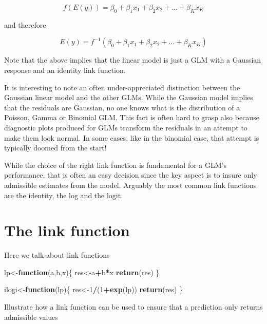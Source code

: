\documentclass[
]{book}
\newenvironment{Shaded}{\begin{snugshade}}{\end{snugshade}}
\newcommand{\ControlFlowTok}[1]{\textcolor[rgb]{0.13,0.29,0.53}{\textbf{#1}}}
\newcommand{\DecValTok}[1]{\textcolor[rgb]{0.00,0.00,0.81}{#1}}
\newcommand{\KeywordTok}[1]{\textcolor[rgb]{0.13,0.29,0.53}{\textbf{#1}}}
\newcommand{\NormalTok}[1]{#1}
\newcommand{\OperatorTok}[1]{\textcolor[rgb]{0.81,0.36,0.00}{\textbf{#1}}}
\begin{document}
\[f(E(y))=\beta_0+\beta_1x_1+\beta_2x_2+...+\beta_Kx_K\]

and therefore

\[E(y)=f^{-1}(\beta_0+\beta_1x_1+\beta_2x_2+...+\beta_Kx_K)\]

Note that the above implies that the linear model is just a GLM with a Gaussian response and an identity link function.

It is interesting to note an often under-appreciated distinction between the Gaussian linear model and the other GLMs. While the Gaussian model implies that the residuals are Gaussian, no one knows what is the distribution of a Poisson, Gamma or Binomial GLM. This fact is often hard to grasp also because diagnostic plots produced for GLMs transform the residuals in an attempt to make them look normal. In some cases, like in the binomial case, that attempt is typically doomed from the start!

While the choice of the right link function is fundamental for a GLM's performance, that is often an easy decision since the key aspect is to insure only admissible estimates from the model. Arguably the most common link functions are the identity, the log and the logit.

\hypertarget{the-link-function}{%
\section{The link function}\label{the-link-function}}

Here we talk about link functions

\begin{Shaded}
\begin{Highlighting}[]
\NormalTok{lp<-}\ControlFlowTok{function}\NormalTok{(a,b,x)\{}
\NormalTok{  res<-a}\OperatorTok{+}\NormalTok{b}\OperatorTok{*}\NormalTok{x}
  \KeywordTok{return}\NormalTok{(res)}
\NormalTok{\}}

\NormalTok{ilogi<-}\ControlFlowTok{function}\NormalTok{(lp)\{}
\NormalTok{  res<-}\DecValTok{1}\OperatorTok{/}\NormalTok{(}\DecValTok{1}\OperatorTok{+}\KeywordTok{exp}\NormalTok{(lp))}
  \KeywordTok{return}\NormalTok{(res)}
\NormalTok{\}}
\end{Highlighting}
\end{Shaded}

Illustrate how a link function can be used to ensure that a prediction only returns admissible values
\end{document}
